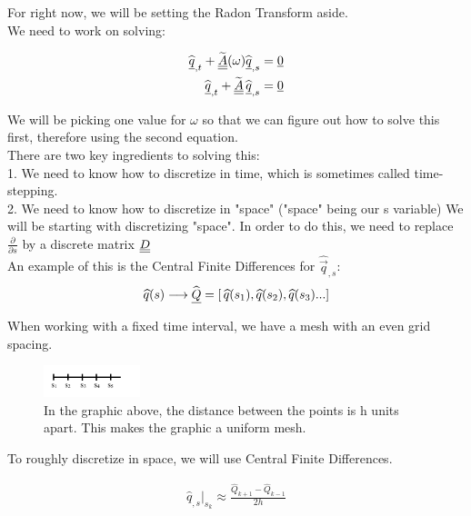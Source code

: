 
For right now, we will be setting the Radon Transform aside. \\

We need to work on solving:

\begin{align*}
\widehat{{\underline{q}}}_{,t} + \widetilde{{\underline{\underline{A}}}}(\omega) \widehat{{\underline{q}}}_{,s} = {\underline{0}} \\
\widehat{{\underline{q}}}_{,t} + \widetilde{{\underline{\underline{A}}}}\,\widehat{{\underline{q}}}_{,s} = {\underline{0}}
\end{align*}

We will be picking one value for $\omega$ so that we can figure out how to solve this first, therefore using the second equation. \\

There are two key ingredients to solving this: \\
1. We need to know how to discretize in time, which is sometimes called time-stepping. \\
2. We need to know how to discretize in "space" ("space" being our s variable)
We will be starting with discretizing "space".
In order to do this, we need to replace $\frac{\partial}{\partial s}$ by a discrete matrix ${\underline{\underline{D}}}$ \\

An example of this is the Central Finite Differences for $\widehat{\vec{q}}_{,s}$: \\

\begin{align*}
\widehat{q}(s)\ms\lra\ms\widehat{\vec{Q}} =  [\,\widehat{q}(s_1)\ms,\ms\widehat{q}(s_2)\ms,\ms\widehat{q}(s_3)\ss.\ss.\ss.\ss]
\end{align*}

When working with a fixed time interval, we have a mesh with an even grid spacing.

\begin{figure}[H]
\centering
\includegraphics[width=0.25\textwidth]{MeshLine.jpg}
\caption{In the graphic above, the distance between the points is h units apart. This makes the graphic a uniform mesh.}
\end{figure}

To roughly discretize in space, we will use Central Finite Differences. 

\begin{align*}
\widehat{q}_{,s} |_{s_k} \approx \frac{\widehat{Q}_{k+1} - \widehat{Q}_{k-1}}{2h}
\end{align*}


